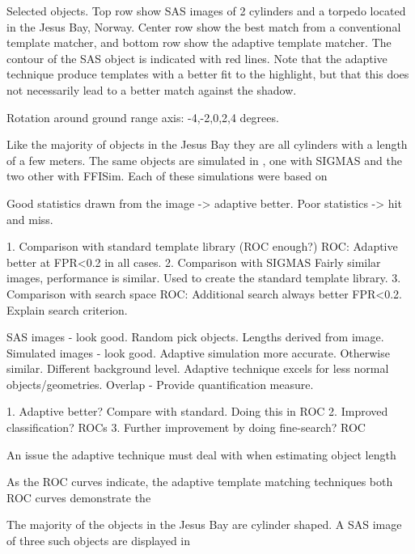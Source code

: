 Selected objects. Top row show SAS images of 2 cylinders and a torpedo located in the Jesus Bay, Norway. Center row show the best match from a conventional template matcher, and bottom row show the adaptive template matcher. The contour of the SAS object is indicated with red lines. Note that the adaptive technique produce templates with a better fit to the highlight, but that this does not necessarily lead to a better match against the shadow.

Rotation around ground range axis: -4,-2,0,2,4 degrees.

Like the majority of objects in the Jesus Bay they are all cylinders with a length of a few meters. The same objects are simulated in , one with SIGMAS and the two other with FFISim. Each of these simulations were based on 





Good statistics drawn from the image -> adaptive better. Poor statistics -> hit and miss.




1. Comparison with standard template library (ROC enough?)
   ROC: Adaptive better at FPR<0.2 in all cases.
2. Comparison with SIGMAS
   Fairly similar images, performance is similar. 
   Used to create the standard template library.
3. Comparison with search space
   ROC: Additional search always better FPR<0.2.
   Explain search criterion.



SAS images - look good. Random pick objects. Lengths derived from image.
Simulated images - look good. Adaptive simulation more accurate. Otherwise similar. Different background level. Adaptive technique excels for less normal objects/geometries.
Overlap - Provide quantification measure. 


1. Adaptive better? Compare with standard. Doing this in ROC
2. Improved classification? ROCs
3. Further improvement by doing fine-search? ROC


An issue the adaptive technique must deal with when estimating object length 

As the ROC curves indicate, the adaptive template matching techniques both  ROC curves demonstrate the 

The majority of the objects in the Jesus Bay are cylinder shaped. A SAS image of three such objects are displayed in 






